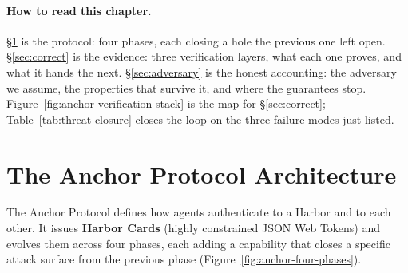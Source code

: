 \documentclass[11pt,a4paper]{article}
\theoremstyle{definition}
\begin{document}
\paragraph{How to read this chapter.} \S\ref{sec:architecture} is the protocol: four phases, each closing a hole the previous one left open. \S\ref{sec:correct} is the evidence: three verification layers, what each one proves, and what it hands the next. \S\ref{sec:adversary} is the honest accounting: the adversary we assume, the properties that survive it, and where the guarantees stop. Figure~\ref{fig:anchor-verification-stack} is the map for \S\ref{sec:correct}; Table~\ref{tab:threat-closure} closes the loop on the three failure modes just listed.

\vspace{4pt}
\noindent{}
\vspace{4pt}

\section{The Anchor Protocol Architecture}\label{sec:architecture}

The Anchor Protocol defines how agents authenticate to a Harbor and to each other. It issues \textbf{Harbor Cards} (highly constrained JSON Web Tokens) and evolves them across four phases, each adding a capability that closes a specific attack surface from the previous phase (Figure~\ref{fig:anchor-four-phases}).


\end{document}
